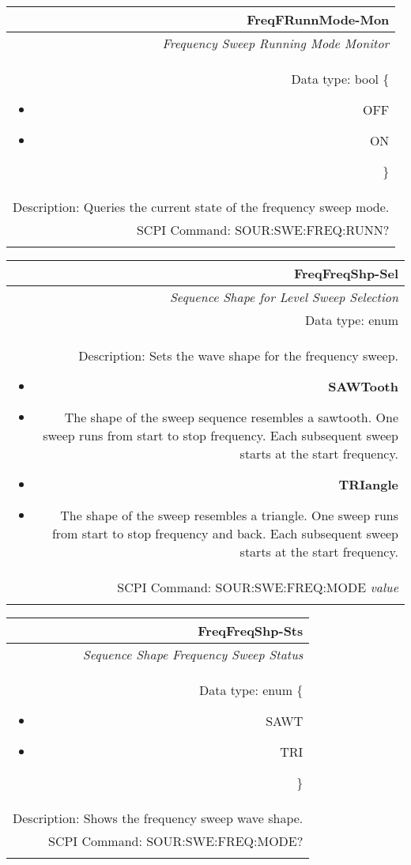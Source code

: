 \documentclass[openany]{article}
\begin{document}
		\begin{tabular}{N}
			\hline
			\bfseries FreqFRunnMode-Mon \\ \hline
			\emph{Frequency Sweep Running Mode Monitor} \\
			Data type: bool \{\begin{itemize}[noitemsep]
				\small
				\item[] OFF
				\item[] ON
			\end{itemize}\} \\
			Description: Queries the current state of the frequency sweep mode. \\
			SCPI Command: SOUR:SWE:FREQ:RUNN? \\
			\\

		\end{tabular}


		\begin{tabular}{N}
			\hline
			\bfseries FreqFreqShp-Sel \\ \hline
			\emph{Sequence Shape for Level Sweep Selection} \\
			Data type: enum \\
			Description: Sets the wave shape for the frequency sweep.\begin{itemize}[noitemsep]
				\small
				\item[] \textbf{SAWTooth}
				\item[] The shape of the sweep sequence resembles a sawtooth. One sweep runs from start to stop frequency. Each subsequent sweep starts at the start frequency.
				\item[] \textbf{TRIangle}
				\item[] The shape of the sweep resembles a triangle. One sweep runs from start to stop frequency and back. Each subsequent sweep starts at the start frequency.
			\end{itemize} \\
			SCPI Command: SOUR:SWE:FREQ:MODE \emph{value} \\
			\\

		\end{tabular}


		\begin{tabular}{N}
			\hline
			\bfseries FreqFreqShp-Sts \\ \hline
			\emph{Sequence Shape Frequency Sweep Status} \\
			Data type: enum \{\begin{itemize}[noitemsep]
				\small
				\item[] SAWT
				\item[] TRI
			\end{itemize}\} \\
			Description: Shows the frequency sweep wave shape. \\
			SCPI Command: SOUR:SWE:FREQ:MODE? \\
			\\

		\end{tabular}
\end{document}
